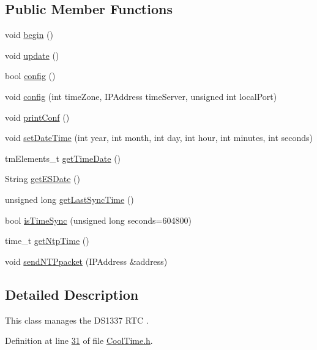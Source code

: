 \subsection*{Public Member Functions}
\begin{DoxyCompactItemize}
\item 
void \hyperlink{class_cool_time_ab1976cf718b950bc31e003c3323b8adb}{begin} ()
\item 
void \hyperlink{class_cool_time_aae601f795452cfa48d9fb337aed483a8}{update} ()
\item 
bool \hyperlink{class_cool_time_a87c28260c1bc77091162cbcf1ee2e129}{config} ()
\item 
void \hyperlink{class_cool_time_ae5528ed0ba9e78c711084968054950e0}{config} (int time\+Zone, I\+P\+Address time\+Server, unsigned int local\+Port)
\item 
void \hyperlink{class_cool_time_af355e7f9b3898211cd2ff25eab5933b1}{print\+Conf} ()
\item 
void \hyperlink{class_cool_time_ab81ea7fdaace111aa01cc1ec84c6d297}{set\+Date\+Time} (int year, int month, int day, int hour, int minutes, int seconds)
\item 
tm\+Elements\+\_\+t \hyperlink{class_cool_time_a7a7501c5ca77dd1248bea704c44f986c}{get\+Time\+Date} ()
\item 
String \hyperlink{class_cool_time_ac4f32ee513c1328d984306645e8785a4}{get\+E\+S\+Date} ()
\item 
unsigned long \hyperlink{class_cool_time_a5d17f707a9d337720493b2bce9d41c21}{get\+Last\+Sync\+Time} ()
\item 
bool \hyperlink{class_cool_time_a5ae038a4498602b189f76a10bf02adf8}{is\+Time\+Sync} (unsigned long seconds=604800)
\item 
time\+\_\+t \hyperlink{class_cool_time_a41fbbbfd651c2079f54d4b2911e4c705}{get\+Ntp\+Time} ()
\item 
void \hyperlink{class_cool_time_a236a38d120dc53bc67456d763838c5a1}{send\+N\+T\+Ppacket} (I\+P\+Address \&address)
\end{DoxyCompactItemize}


\subsection{Detailed Description}
This class manages the D\+S1337 R\+TC . 

Definition at line \hyperlink{_cool_time_8h_source_l00031}{31} of file \hyperlink{_cool_time_8h_source}{Cool\+Time.\+h}.



